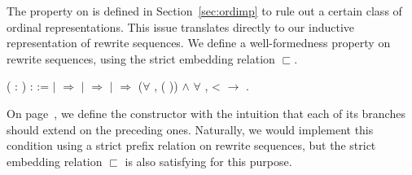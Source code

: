 The  property on
 is defined in
Section~\ref{sec:ordimp} to rule out a
certain class of ordinal representations. This issue translates
directly to our inductive representation of rewrite sequences. We
define a well-formedness property
 on rewrite sequences,
using the strict embedding relation $\sqsubset$.
\begin{singlespace}
\begin{coqdoccode}
\coqdocnoindent
{} 
 
(\coqdocvar{$\varphi$} : 
) : 
:=\coqdoceol
\coqdocindent{1.00em}
 \coqdocvariable{$\varphi$} \coqdoceol
\coqdocindent{1.00em}
\ensuremath{|} 
\coqdocvar{\_}          \ensuremath{\Rightarrow}
\coqdoceol
\coqdocindent{1.00em}
\ensuremath{|} 
\coqdocvar{\_} \coqdocvar{\_} \coqdocvar{$\psi$} \coqdocvar{\_}
\coqdocvar{\_} \ensuremath{\Rightarrow}
\coqdocvariable{\coqdocvariable{$\psi$}}\coqdoceol
\coqdocindent{1.00em}
\ensuremath{|} 
\coqdocvar{\_} \coqdocvar{\_}  \coqdocvar{\_}
\coqdocvar{\_}  \ensuremath{\Rightarrow}
(\ensuremath{\forall} ,
 (
)) \ensuremath{\land}
\ensuremath{\forall}  , 
<  \ensuremath{\rightarrow} 
 \coqdoceol
\coqdocindent{1.00em}
.\coqdoceol
\end{coqdoccode}
\end{singlespace}

On page~\pageref{coq:lim}, we define the
 constructor with the
intuition that each of its branches should extend on the preceding
ones. Naturally, we would implement this condition using a strict prefix
relation on rewrite sequences, but the strict embedding relation
$\sqsubset$ is also satisfying for this purpose.

